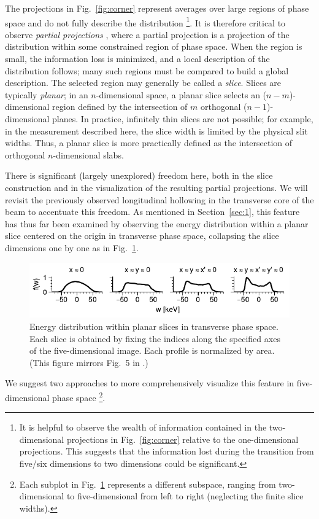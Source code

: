 \documentclass[%
 reprint,
 amsmath,amssymb,
 aps,
prstab,
]{revtex4-2}
\begin{document}
The projections in Fig.~\ref{fig:corner} represent averages over large regions of phase space and do not fully describe the distribution \footnote{It is helpful to observe the wealth of information contained in the two-dimensional projections in Fig.~\ref{fig:corner} relative to the one-dimensional projections. This suggests that the information lost during the transition from five/six dimensions to two dimensions could be significant.}. It is therefore critical to observe \textit{partial projections} \cite{Cathey2018, Ruisard2020}, where a partial projection is a projection of the distribution within some constrained region of phase space. When the region is small, the information loss is minimized, and a local description of the distribution follows; many such regions must be compared to build a global description. The selected region may generally be called a \textit{slice}. Slices are typically \textit{planar}; in an $n$-dimensional space, a planar slice selects an ($n - m$)-dimensional region defined by the intersection of $m$ orthogonal ($n - 1$)-dimensional planes. In practice, infinitely thin slices are not possible; for example, in the measurement described here, the slice width is limited by the physical slit widths. Thus, a planar slice is more practically defined as the intersection of orthogonal $n$-dimensional slabs.

There is significant (largely unexplored) freedom here, both in the slice construction and in the visualization of the resulting partial projections. We will revisit the previously observed longitudinal hollowing in the transverse core of the beam to accentuate this freedom. As mentioned in Section~\ref{sec:1}, this feature has thus far been examined by observing the energy distribution within a planar slice centered on the origin in transverse phase space, collapsing the slice dimensions one by one as in Fig.~\ref{fig:hollow_energy_a}.
%
\begin{figure}
    \centering
    \includegraphics[width=\columnwidth]{fig_fw_slices.pdf}
    \caption{Energy distribution within planar slices in transverse phase space. Each slice is obtained by fixing the indices along the specified axes of the five-dimensional image. Each profile is normalized by area. (This figure mirrors Fig.~5 in \cite{Cathey2018}.)}
    \label{fig:hollow_energy_a}
\end{figure}
%
We suggest two approaches to more comprehensively visualize this feature in five-dimensional phase space \footnote{Each subplot in Fig.~\ref{fig:hollow_energy_a} represents a different subspace, ranging from two-dimensional to five-dimensional from left to right (neglecting the finite slice widths).}.
\end{document}
